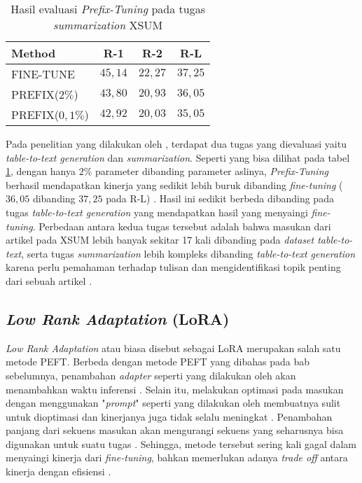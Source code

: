 \begin{table}[h]
    \vspace{0.25cm}
    \centering
    \caption{Hasil evaluasi \textit{Prefix-Tuning} pada tugas \textit{summarization} XSUM \parencite{prefix_tuning}}
    \label{table:prefix_tuning_result}
    \begin{tabular}{lccc}
        \toprule
        Method & R-1 & R-2 & R-L \\
        \midrule
        FINE-TUNE & $45,14$ & $22,27$ & $37,25$ \\
        PREFIX($2\%$) & $43,80$ & $20,93$ & $36,05$ \\
        PREFIX($0,1\%$) & $42,92$ & $20,03$ & $35,05$ \\
        \bottomrule
    \end{tabular}
\end{table}

Pada penelitian yang dilakukan oleh \citeauthor{prefix_tuning}, terdapat dua tugas yang dievaluasi yaitu \textit{table-to-text generation} dan \textit{summarization}. Seperti yang bisa dilihat pada tabel \ref{table:prefix_tuning_result}, dengan hanya $2\%$ parameter dibanding parameter aslinya, \textit{Prefix-Tuning} berhasil mendapatkan kinerja yang sedikit lebih buruk dibanding \textit{fine-tuning} ($36,05$ dibanding $37,25$ pada R-L) \parencite{prefix_tuning}. Hasil ini sedikit berbeda dibanding pada tugas \textit{table-to-text generation} yang mendapatkan hasil yang menyaingi \textit{fine-tuning}. Perbedaan antara kedua tugas tersebut adalah bahwa masukan dari artikel pada XSUM lebih banyak sekitar 17 kali dibanding pada \textit{dataset table-to-text}, serta tugas \textit{summarization} lebih kompleks dibanding \textit{table-to-text generation} karena perlu pemahaman terhadap tulisan dan mengidentifikasi topik penting dari sebuah artikel \parencite{prefix_tuning}.

\subsection{\textit{Low Rank Adaptation} (LoRA)}

\textit{Low Rank Adaptation} atau biasa disebut sebagai LoRA merupakan salah satu metode PEFT. Berbeda dengan metode PEFT yang dibahas pada bab sebelumnya, penambahan \textit{adapter} seperti yang dilakukan oleh \citeauthor{adapter_houlsby} akan menambahkan waktu inferensi \parencite{lora}. Selain itu, melakukan optimasi pada masukan dengan menggunakan "\textit{prompt}" seperti yang dilakukan oleh \citeauthor{prefix_tuning} membuatnya sulit untuk dioptimasi dan kinerjanya juga tidak selalu meningkat \parencite{lora}. Penambahan panjang dari sekuens masukan akan mengurangi sekuens yang seharusnya bisa digunakan untuk suatu tugas \parencite{lora}. Sehingga, metode tersebut sering kali gagal dalam menyaingi kinerja dari \textit{fine-tuning}, bahkan memerlukan adanya \textit{trade off} antara kinerja dengan efisiensi \parencite{lora}.

